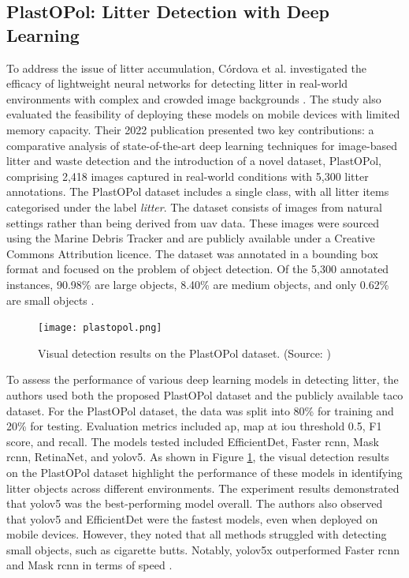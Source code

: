 \subsection{PlastOPol: Litter Detection with Deep Learning}
\label{subsec:3_plastopol}

To address the issue of litter accumulation, Córdova et al. investigated the efficacy of lightweight neural networks for detecting litter in real-world environments with complex and crowded image backgrounds \cite{plastopol}. The study also evaluated the feasibility of deploying these models on mobile devices with limited memory capacity. Their 2022 publication presented two key contributions: a comparative analysis of state-of-the-art deep learning techniques for image-based litter and waste detection and the introduction of a novel dataset, PlastOPol, comprising 2,418 images captured in real-world conditions with 5,300 litter annotations.
The PlastOPol dataset includes a single class, with all litter items categorised under the label \textit{litter}. The dataset consists of images from natural settings rather than being derived from \gls{uav} data. These images were sourced using the Marine Debris Tracker and are publicly available under a Creative Commons Attribution licence. The dataset was annotated in a bounding box format and focused on the problem of object detection. Of the 5,300 annotated instances, 90.98\% are large objects, 8.40\% are medium objects, and only 0.62\% are small objects \cite{plastopol}.

\begin{figure}[!htbp]
    \centering
    \texttt{[image: plastopol.png]}
    \caption{Visual detection results on the PlastOPol dataset. (Source: \cite{plastopol})}
    \label{fig:plastopol}
\end{figure}

To assess the performance of various deep learning models in detecting litter, the authors used both the proposed PlastOPol dataset and the publicly available \gls{taco} dataset. For the PlastOPol dataset, the data was split into 80\% for training and 20\% for testing. Evaluation metrics included \gls{ap}, \gls{map} at \gls{iou} threshold 0.5, F1 score, and recall. The models tested included EfficientDet, Faster \gls{rcnn}, Mask \gls{rcnn}, RetinaNet, and \gls{yolo}v5. As shown in Figure \ref{fig:plastopol}, the visual detection results on the PlastOPol dataset highlight the performance of these models in identifying litter objects across different environments.
The experiment results demonstrated that \gls{yolo}v5 was the best-performing model overall. The authors also observed that \gls{yolo}v5 and EfficientDet were the fastest models, even when deployed on mobile devices. However, they noted that all methods struggled with detecting small objects, such as cigarette butts. Notably, \gls{yolo}v5x outperformed Faster \gls{rcnn} and Mask \gls{rcnn} in terms of speed \cite{plastopol}.

